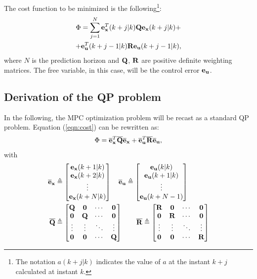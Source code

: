 \documentclass[twocolumn]{IEEEtran} %
\begin{document}
The cost function to be minimized is the following\footnote{The notation $a(k+j|k)$ indicates the value of $a$ at the instant $k+j$ calculated at instant $k$.}:
\begin{multline}\label{eqn:cost}
	\Phi = \sum_{j=1}^{N}{\bf e}_{\bf x}^T(k+j|k){\bf Q}{\bf e}_{\bf x}(k+j|k) + \\ + {\bf e}_{\bf u}^T(k+j-1|k){\bf R}{\bf e}_{\bf u}(k+j-1|k),
\end{multline}
where $N$ is the prediction horizon and ${\bf Q}$, ${\bf R}$ are positive definite weighting matrices. The free variable, in this case, will be the control error ${\bf e_u}$.

\subsection{Derivation of the QP problem}\label{sec:qp}
In the following, the MPC optimization problem will be recast as a standard QP problem. Equation (\ref{eqn:cost}) can be rewritten as:
\begin{equation}\label{eqn:cost2}
	\Phi = \overline{\bf e}_{\bf x}^T\overline{\bf Q}\overline{\bf e}_{\bf x} + \overline{\bf e}_{\bf u}^T\overline{\bf R}\overline{\bf e}_{\bf u},
\end{equation}
with
\begin{align*}
	\overline {\bf e}_{\bf x} &\triangleq \begin{bmatrix}
		{\bf e}_{\bf x}(k+1|k) \\ {\bf e}_{\bf x}(k+2|k) \\ \vdots \\ {\bf e}_{\bf x}(k+N|k) 
	\end{bmatrix} \quad
	\overline{\bf e}_{\bf u} \triangleq \begin{bmatrix}
		{\bf e_u}(k|k)  \\ {\bf e_u}(k+1|k) \\ \vdots \\ {\bf e_u}(k+N-1)
	\end{bmatrix} \\
	\overline {\bf Q} &\triangleq \begin{bmatrix}
		{\bf Q} & {\bf 0} & \cdots & {\bf 0} \\
		{\bf 0} & {\bf Q} & \cdots & {\bf 0} \\
		\vdots  & \vdots  & \ddots & \vdots  \\
		{\bf 0} & {\bf 0} & \cdots & {\bf Q} \\
	\end{bmatrix} \qquad
	\overline {\bf R} \triangleq \begin{bmatrix}
		{\bf R} & {\bf 0} & \cdots & {\bf 0} \\
		{\bf 0} & {\bf R} & \cdots & {\bf 0} \\
		\vdots  & \vdots  & \ddots & \vdots  \\
		{\bf 0} & {\bf 0} & \cdots & {\bf R} \\
	\end{bmatrix}
\end{align*}
\end{document}
